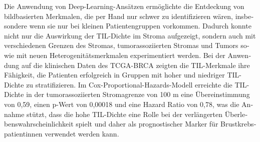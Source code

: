 \begin{otherlanguage}{ngerman}
Die Anwendung von Deep-Learning-Ansätzen ermöglichte die Entdeckung von bildbasierten Merkmalen, die per Hand nur schwer zu identifizieren wären, insbesondere wenn sie nur bei kleinen Patientengruppen vorkommen. Dadurch konnte nicht nur die Auswirkung der TIL-Dichte im Stroma aufgezeigt, sondern auch mit verschiedenen Grenzen des Stromas, tumorassoziierten Stromas und Tumors sowie mit neuen Heterogenitätsmerkmalen experimentiert werden.
Bei der Anwendung auf die klinischen Daten des TCGA-BRCA zeigten die TIL-Merkmale ihre Fähigkeit, die Patienten erfolgreich in Gruppen mit hoher und niedriger TIL-Dichte zu stratifizieren. Im Cox-Proportional-Hazards-Modell erreichte die TIL-Dichte in der tumorassoziierten Stromagrenze von 100 \textmu m eine Übereinstimmung von 0,59, einen p-Wert von 0,00018 und eine Hazard Ratio von 0,78, was die Annahme stützt, dass die hohe TIL-Dichte eine Rolle bei der verlängerten Überlebenswahrscheinlichkeit spielt und daher als prognostischer Marker für Brustkrebspatientinnen verwendet werden kann.
\end{otherlanguage}


\makeatletter
{}
{\renewcommand{\abstractname}{Abstract}}
{\renewcommand{\abstractname}{Kurzfassung}}
\makeatother